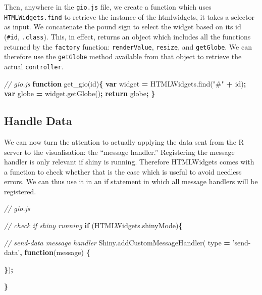 \documentclass[10pt,]{krantz}
\makeatletter
\newenvironment{Shaded}{\begin{snugshade}}{\end{snugshade}}
\newcommand{\AttributeTok}[1]{\textcolor[rgb]{0.61,0.61,0.61}{#1}}
\newcommand{\CommentTok}[1]{\textcolor[rgb]{0.37,0.37,0.37}{\textit{#1}}}
\newcommand{\ControlFlowTok}[1]{\textcolor[rgb]{0.27,0.27,0.27}{\textbf{#1}}}
\newcommand{\KeywordTok}[1]{\textcolor[rgb]{0.27,0.27,0.27}{\textbf{#1}}}
\newcommand{\NormalTok}[1]{#1}
\newcommand{\OperatorTok}[1]{\textcolor[rgb]{0.43,0.43,0.43}{\textbf{#1}}}
\newcommand{\StringTok}[1]{\textcolor[rgb]{0.5,0.5,0.5}{#1}}
\newcommand{\VariableTok}[1]{\textcolor[rgb]{0,0,0}{#1}}
\newenvironment{kframe}{%
\medskip{}
\setlength{\fboxsep}{.8em}
 \def\at@end@of@kframe{}%
 \ifinner\ifhmode%
  \def\at@end@of@kframe{\end{minipage}}%
  \begin{minipage}{\columnwidth}%
 \fi\fi%
 \def\FrameCommand##1{\hskip\@totalleftmargin \hskip-\fboxsep
 \colorbox{shadecolor}{##1}\hskip-\fboxsep
     \hskip-\linewidth \hskip-\@totalleftmargin \hskip\columnwidth}%
 \MakeFramed {\advance\hsize-\width
   \@totalleftmargin\z@ \linewidth\hsize
   \@setminipage}}%
 {\par\unskip\endMakeFramed%
 \at@end@of@kframe}
\renewenvironment{Shaded}{\begin{kframe}}{\end{kframe}}
\makeatother
\begin{document}
Then, anywhere in the \texttt{gio.js} file, we create a function which uses \texttt{HTMLWidgets.find} to retrieve the instance of the htmlwidgets, it takes a selector as input. We concatenate the pound sign to select the widget based on its id (\texttt{\#id}, \texttt{.class}). This, in effect, returns an object which includes all the functions returned by the \texttt{factory} function: \texttt{renderValue}, \texttt{resize}, and \texttt{getGlobe}. We can therefore use the \texttt{getGlobe} method available from that object to retrieve the actual \texttt{controller}.

\begin{Shaded}
\begin{Highlighting}[]
\CommentTok{// gio.js}
\KeywordTok{function} \AttributeTok{get_gio}\NormalTok{(id)}\OperatorTok{\{}
  \KeywordTok{var}\NormalTok{ widget }\OperatorTok{=} \VariableTok{HTMLWidgets}\NormalTok{.}\AttributeTok{find}\NormalTok{(}\StringTok{"#"} \OperatorTok{+}\NormalTok{ id)}\OperatorTok{;}
  \KeywordTok{var}\NormalTok{ globe }\OperatorTok{=} \VariableTok{widget}\NormalTok{.}\AttributeTok{getGlobe}\NormalTok{()}\OperatorTok{;}
  \ControlFlowTok{return}\NormalTok{ globe}\OperatorTok{;}
\OperatorTok{\}}
\end{Highlighting}
\end{Shaded}

\hypertarget{shiny-widgets-handle-data}{%
\subsection{Handle Data}\label{shiny-widgets-handle-data}}

We can now turn the attention to actually applying the data sent from the R server to the visualisation: the ``message handler.'' Registering the message handler is only relevant if shiny is running. Therefore HTMLWidgets comes with a function to check whether that is the case which is useful to avoid needless errors. We can thus use it in an if statement in which all message handlers will be registered.

\begin{Shaded}
\begin{Highlighting}[]
\CommentTok{// gio.js}

\CommentTok{// check if shiny running}
\ControlFlowTok{if}\NormalTok{ (}\VariableTok{HTMLWidgets}\NormalTok{.}\AttributeTok{shinyMode}\NormalTok{)}\OperatorTok{\{}

  \CommentTok{// send-data message handler}
  \VariableTok{Shiny}\NormalTok{.}\AttributeTok{addCustomMessageHandler}\NormalTok{(}
\NormalTok{    type }\OperatorTok{=} \StringTok{'send-data'}\OperatorTok{,} \KeywordTok{function}\NormalTok{(message) }\OperatorTok{\{}

  \OperatorTok{\}}\NormalTok{)}\OperatorTok{;}

\OperatorTok{\}}
\end{Highlighting}
\end{Shaded}
\end{document}
